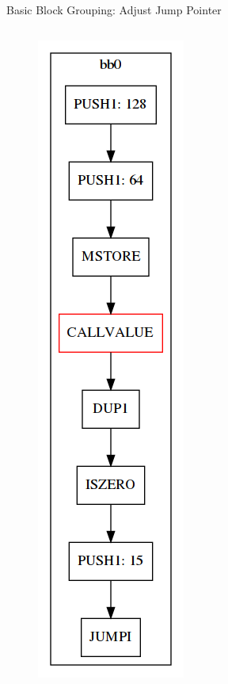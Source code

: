 \documentclass[11pt]{beamer}
\begin{document}
\begin{frame}{Basic Block Grouping: Adjust Jump Pointer}
\begin{columns}
{\begin{figure}
        \includegraphics[scale=0.25]{figures/stack/cfg_stack4.png}
    \end{figure}
}
\end{columns}
\end{frame}
\end{document}
